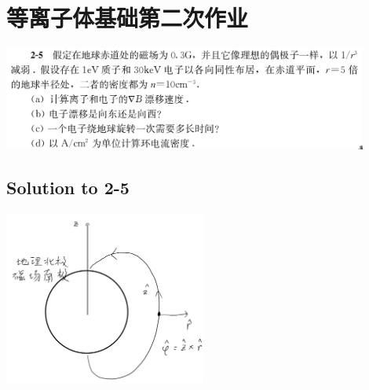
\section{等离子体基础第二次作业}

\includegraphics[width=0.9\textwidth]{figures/2022-09-30T114621+0800.png}

\subsection{Solution to 2-5}
\includegraphics[width=0.5\textwidth]{figures/2022-09-30T114803+0800.png} \\

